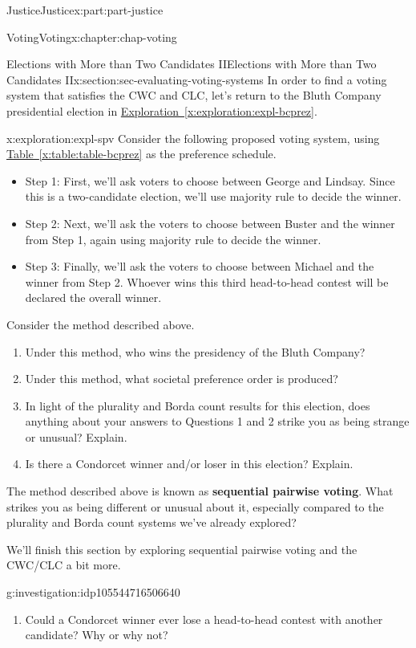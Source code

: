 \documentclass[oneside,10pt,]{book}
\newcommand{\xreffont}{\relax}
\newcommand{\terminology}[1]{\textbf{#1}}
\numberwithin{equation}{section}
\begin{document}
\begin{partptx}{Justice}{}{Justice}{}{}{x:part:part-justice}
\begin{chapterptx}{Voting}{}{Voting}{}{}{x:chapter:chap-voting}
\begin{sectionptx}{Elections with More than Two Candidates II}{}{Elections with More than Two Candidates II}{}{}{x:section:sec-evaluating-voting-systems}
In order to find a voting system that satisfies the CWC and CLC, let's return to the Bluth Company presidential election in \hyperref[x:exploration:expl-bcprez]{Exploration~{\xreffont\ref{x:exploration:expl-bcprez}}}.%
\begin{exploration}{}{x:exploration:expl-spv}%
Consider the following proposed voting system, using \hyperref[x:table:table-bcprez]{Table~{\xreffont\ref{x:table:table-bcprez}}} as the preference schedule.%
%
\begin{itemize}[label=\textbullet]
\item{}Step 1: First, we'll ask voters to choose between George and Lindsay. Since this is a two-candidate election, we'll use majority rule to decide the winner.%
\item{}Step 2: Next, we'll ask the voters to choose between Buster and the winner from Step 1, again using majority rule to decide the winner.%
\item{}Step 3: Finally, we'll ask the voters to choose between Michael and the winner from Step 2. Whoever wins this third head-to-head contest will be declared the overall winner.%
\end{itemize}
Consider the method described above.%
%
\begin{enumerate}
\item{}Under this method, who wins the presidency of the Bluth Company?%
\item{}Under this method, what societal preference order is produced?%
\item{}In light of the plurality and Borda count results for this election, does anything about your answers to Questions 1 and 2 strike you as being strange or unusual? Explain.%
\item{}Is there a Condorcet winner and\slash{}or loser in this election? Explain.%
\end{enumerate}
The method described above is known as \terminology{sequential pairwise voting}. What strikes you as being different or unusual about it, especially compared to the plurality and Borda count systems we've already explored?%
\end{exploration}%
We'll finish this section by exploring sequential pairwise voting and the CWC\slash{}CLC a bit more.%
\begin{investigation}{}{g:investigation:idp105544716506640}%
%
\begin{enumerate}
\item{}Could a Condorcet winner ever lose a head-to-head contest with another candidate? Why or why not?%

\end{enumerate}
\end{investigation}
\end{sectionptx}
\end{chapterptx}
\end{partptx}
\end{document}
